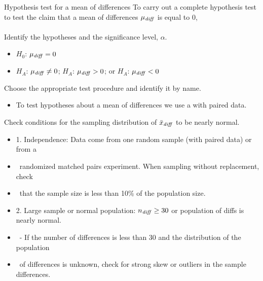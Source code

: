 






\begin{onebox}{Hypothesis test for a mean of differences}
To carry out a complete hypothesis test to test the claim that a mean of differences $\mu_{\text{\emph{diff}}}$ is equal to 0,
\\
\\
 Identify the hypotheses and the significance level, $\alpha$.\vspace{-1mm}
\begin{itemize}
\setlength{\itemsep}{0mm}
\item[] $H_0$: $\mu_{\text{\emph{diff}}} = 0$  
\item[]  $H_A$: $\mu_{\text{\emph{diff}}} \ne 0$;  \quad $H_A$: $\mu_{\text{\emph{diff}}} > 0$; \quad or \quad $H_A$: $\mu_{\text{\emph{diff}}} < 0$ 
\end{itemize} 
 Choose the appropriate test procedure and identify it by name.  \vspace{-1mm}
\begin{itemize}
\item[] To test hypotheses about a mean of differences we use a  with paired data.
\end{itemize}
  Check conditions for the sampling distribution of $\bar{x}_{\text{\emph{diff}}}$ to be nearly normal.\vspace{-1mm}
\begin{itemize}
\setlength{\itemsep}{0mm}
\item[] 1. Independence:  Data come from one random sample (with paired data) or from a 
\item[] \ \quad randomized matched pairs experiment.  When sampling without replacement, check 
\item[] \ \quad that the sample size is less than 10\% of the population size.
\item[] 2. Large sample or normal population:  $n_{\text{\emph{diff}}}\ge 30$ or population of diffs is nearly normal.
 \item[] \quad \  - If the number of differences is less than 30 and the distribution of the population 
 \item[] \quad \ of differences is unknown, check for strong skew or outliers in the sample differences.

\end{itemize}
\end{onebox}
